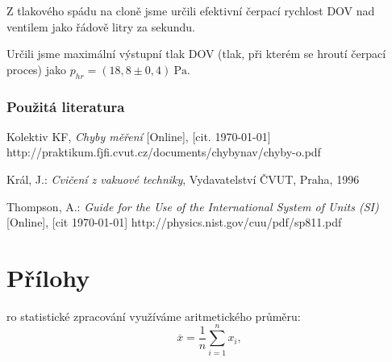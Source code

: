 \documentclass[english]{article}
\newcommand{\unit}[1]{~\mathrm{#1}}
\begin{document}
	Z tlakového spádu na cloně jsme určili efektivní čerpací rychlost DOV nad ventilem jako řádově litry za sekundu.
	
	Určili jsme maximální výstupní tlak DOV (tlak, při kterém se hroutí čerpací proces) jako $p_{hr} = (18,8\pm0,4)\unit{Pa}$.
	
\section {Použitá literatura}
\begingroup
\renewcommand{\section}[2]{}

\begin{thebibliography}{9}

 Kolektiv KF, \emph{Chyby měření} [Online], [cit. \today] \newline http://praktikum.fjfi.cvut.cz/documents/chybynav/chyby-o.pdf

Král, J.: \emph{Cvičení z vakuové techniky},
Vydavatelství ČVUT, Praha, 1996

 
Thompson, A.: \emph{Guide for the Use of the International System of Units (SI)} [Online], [cit \today] \newline
http://physics.nist.gov/cuu/pdf/sp811.pdf
 

\end{thebibliography}
\endgroup
\setcounter{equation}{0}

\clearpage
\part*{Přílohy}

\section{Statistické zpracování dat}
	Pro statistické zpracování využíváme aritmetického průměru:
	\begin{equation} \label{eq:aritmeticky_prumer}
	\overline{x} = \frac{1}{n}\sum\limits_{i=1}^{n}x_i,
	\end{equation}
\end{document}
